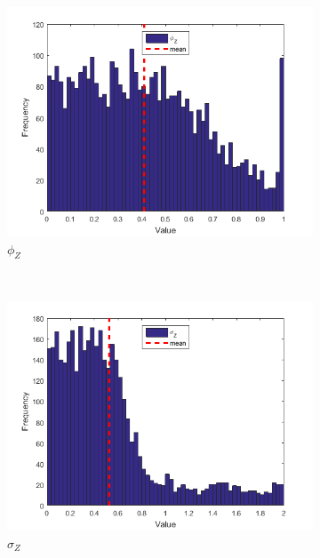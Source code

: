 \documentclass[11pt,a4,twosided,singlespacing,titlepagenumber=on]{scrreprt}
\numberwithin{equation}{chapter} %
\theoremstyle{remark}
\begin{document}
\begin{figure}[H]
\begin{subfigure}[t]{0.32\textwidth}
        \includegraphics[width=1\textwidth]{res/params/1462_2192/3}
        \caption{$\phi_Z$}
    \end{subfigure} \\
    \begin{subfigure}[t]{0.32\textwidth}
        \centering
        \includegraphics[width=1\textwidth]{res/params/1462_2192/4}
        \caption{$\sigma_Z$}
    \end{subfigure}
    \begin{subfigure}[t]{0.32\textwidth}
        \centering

\end{subfigure}
\end{figure}
\end{document}
